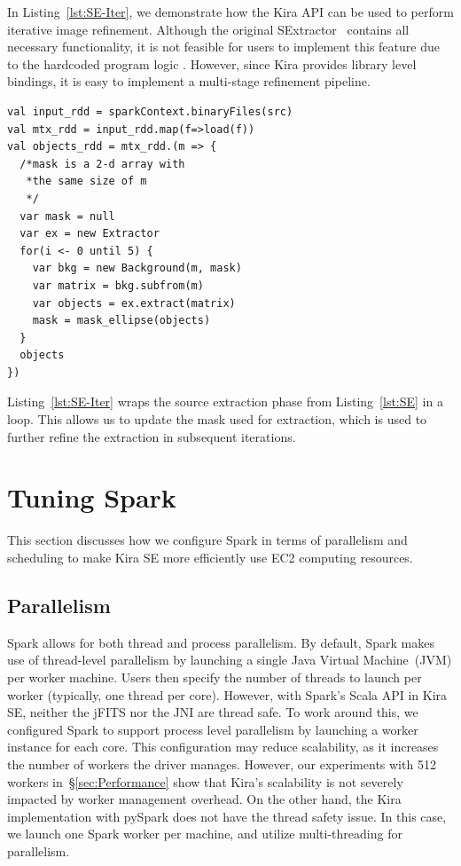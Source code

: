 \documentclass[10pt,journal,compsoc]{IEEEtran}
\begin{document}
In Listing~\ref{lst:SE-Iter}, we demonstrate how the Kira API can be used to perform
iterative image refinement. Although the original SExtractor~\cite{bertin96} contains all necessary functionality, 
it is not feasible for users to implement this feature due to the hardcoded program logic . However, since Kira provides
library level bindings, it is easy to implement a multi-stage refinement pipeline.

\begin{lstlisting}[caption=Iterative Objects Extraction Logic, label=lst:SE-Iter, linewidth=0.5\textwidth, xleftmargin=2.5ex]
val input_rdd = sparkContext.binaryFiles(src)
val mtx_rdd = input_rdd.map(f=>load(f))
val objects_rdd = mtx_rdd.(m => {
  /*mask is a 2-d array with 
   *the same size of m
   */
  var mask = null
  var ex = new Extractor   
  for(i <- 0 until 5) {
    var bkg = new Background(m, mask)
    var matrix = bkg.subfrom(m) 
    var objects = ex.extract(matrix)
    mask = mask_ellipse(objects)  
  }
  objects
})
\end{lstlisting}

Listing~\ref{lst:SE-Iter} wraps the source extraction phase from Listing~\ref{lst:SE} in a loop. 
This allows us to update the mask used for extraction, which is used to further refine the extraction
 in subsequent iterations.


\section{Tuning Spark}
This section discusses how we configure Spark in terms of parallelism and scheduling to make
Kira SE more efficiently use EC2 computing resources. 

\subsection{Parallelism}

Spark allows for both thread and process parallelism. By default, Spark makes use of
thread-level parallelism by launching a single Java Virtual Machine~(JVM) per worker machine.
Users then specify the number of threads to launch per worker (typically, one thread per core).
However, with Spark's Scala API in Kira SE, neither the jFITS nor the JNI are thread safe. 
To work around this, we configured Spark to support process level parallelism by launching 
a worker instance for each core. 
This configuration may reduce scalability, as it increases the number of workers the driver manages. 
However, our experiments with 512 workers in~\S\ref{sec:Performance} show that Kira's scalability is 
not severely impacted by worker management overhead.
On the other hand, the Kira implementation with pySpark does not have the thread safety issue.
In this case, we launch one Spark worker per machine, and utilize multi-threading for parallelism.
\end{document}
